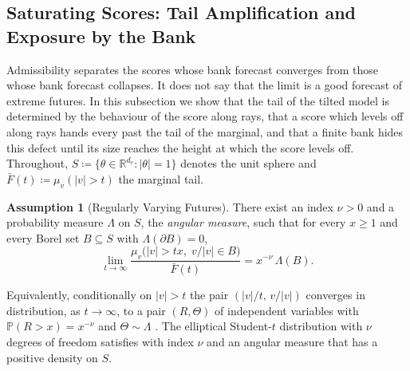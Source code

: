 \documentclass[11pt]{article}
\theoremstyle{plain}
\theoremstyle{definition}
\newtheorem{assumption}[theorem]{Assumption}
\theoremstyle{remark}
\newcommand{\RR}{\mathbb{R}}
\newcommand{\define}{\coloneqq}
\newcommand{\abs}[1]{\left\lvert #1 \right\rvert}
\begin{document}
\subsection{Saturating Scores: Tail Amplification and Exposure by the Bank}
\label{ssec:saturation}

Admissibility separates the scores whose bank forecast converges from those
whose bank forecast collapses. It does not say that the limit is a good
forecast of extreme futures. In this subsection we show that the tail of the
tilted model is determined by the behaviour of the score along rays, that a
score which levels off along rays hands every past the tail of the marginal,
and that a finite bank hides this defect until its size reaches the height at
which the score levels off. Throughout, $S\define\{\theta\in\RR^{d_v}:\abs{\theta}=1\}$
denotes the unit sphere and $\bar F(t)\define\mu_v(\abs{v}>t)$ the marginal
tail.

\begin{assumption}[Regularly Varying Futures]
 \label{ass:rv}
 There exist an index $\nu>0$ and a probability measure $\Lambda$ on $S$, the
 \emph{angular measure}, such that for every $x\ge1$ and every Borel set
 $B\subseteq S$ with $\Lambda(\partial B)=0$,
 \begin{equation}
  \lim_{t\to\infty}\frac{\mu_v\bigl(\abs{v}>tx,\;v/\abs{v}\in B\bigr)}{\bar F(t)}
  =x^{-\nu}\,\Lambda(B).
  \label{eq:rv}
 \end{equation}
\end{assumption}

Equivalently, conditionally on $\abs{v}>t$ the pair $(\abs{v}/t,\,v/\abs{v})$
converges in distribution, as $t\to\infty$, to a pair $(R,\Theta)$ of
independent variables with $\mathbb{P}(R>x)=x^{-\nu}$ and $\Theta\sim\Lambda$
\cite{resnick2007heavy}. The elliptical Student-$t$ distribution with $\nu$
degrees of freedom satisfies  with index $\nu$ and an angular
measure that has a positive density on $S$.
\end{document}
